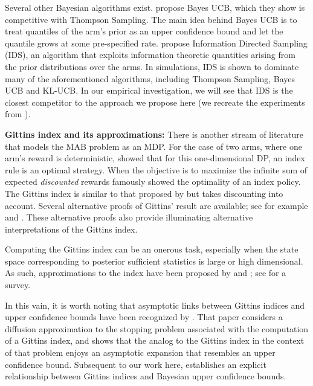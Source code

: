 Several other Bayesian algorithms exist. \cite{kaufmann2012thompson} propose Bayes UCB, which they show is competitive with Thompson Sampling. The main idea behind Bayes UCB is to treat quantiles of the arm's prior as an upper confidence bound and let the quantile grows at some pre-specified rate. \cite{russo2014learning} propose Information Directed Sampling (IDS), an algorithm that exploits information theoretic quantities arising from the prior distributions over the arms. In simulations, IDS is shown to dominate many of the aforementioned algorithms, including Thompson Sampling, Bayes UCB and KL-UCB. In our empirical investigation, we will see that IDS is the closest competitor to the approach we propose here (we recreate the experiments from \cite{russo2014learning}).

\noindent\textbf{\textsf{Gittins index and its approximations: }}
There is another stream of literature that models the MAB problem as an MDP. For the case of two arms, where one arm's reward is deterministic, \cite{bradt1956sequential} showed that for this one-dimensional DP, an index rule is an optimal strategy. When the objective is to maximize the infinite sum of expected \emph{discounted} rewards \cite{gittins1979bandit} famously showed the optimality of an index policy. The Gittins index is similar to that proposed by \cite{bradt1956sequential} but takes discounting into account. Several alternative proofs of Gittins' result are available; see for example \citep{tsitsiklis1994short,weber1992gittins,whittle1980multi} and \citep{bertsimas1996conservation}. These alternative proofs also provide illuminating alternative interpretations of the Gittins index.  
 
Computing the Gittins index can be an onerous task, especially when the state space corresponding to posterior sufficient statistics is large or high dimensional. As such, approximations to the index have been proposed by \cite{yao2006some,katehakis1987multi} and \cite{varaiya1985extensions}; see \citep{chakravorty2013multi} for a survey. 

{\color{blue}
In this vain, it is worth noting that asymptotic links between Gittins indices and upper confidence bounds have been recognized by \cite{fang1987characterization}. That paper considers a diffusion approximation to the stopping problem associated with the computation of a Gittins index, and shows that the analog to the Gittins index in the context of that problem enjoys an asymptotic expansion that resembles an upper confidence bound. Subsequent to our work here, \cite{russo2019note} establishes an explicit relationship between Gittins indices and Bayesian upper confidence bounds. 
}

